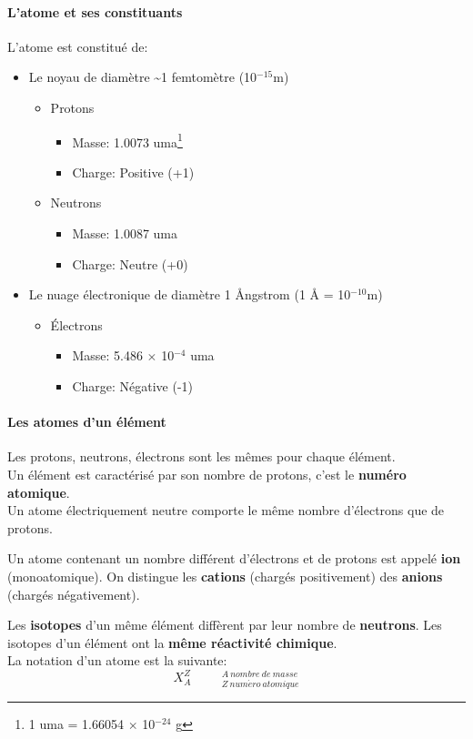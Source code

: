 \documentclass[10pt,a4paper]{book}
\begin{document}
\paragraph{L'atome et ses constituants} L'atome est constitué de:
\begin{itemize}
\item Le noyau de diamètre \textasciitilde 1 femtomètre (10$^{-15}$m)
\begin{itemize}
\item Protons
\begin{itemize}
	\item Masse: 1.0073 uma\footnote{1 uma = 1.66054 $\times$ 10$^{-24}$ g}
	\item Charge: Positive (+1) 
\end{itemize}
\item Neutrons
\begin{itemize}
	\item Masse: 1.0087 uma
	\item Charge: Neutre (+0) 
\end{itemize}
\end{itemize}
\item Le nuage électronique de diamètre 1 {\AA}ngstrom (1 {\AA} = 10$^{-10}$m)
\begin{itemize}
\item Électrons
\begin{itemize}
	\item Masse: 5.486 $\times$ 10$^{-4}$ uma
	\item Charge: Négative (-1) 
\end{itemize}
\end{itemize}
\end{itemize}
\paragraph{Les atomes d'un élément} Les protons, neutrons, électrons sont les mêmes pour chaque élément. \\ 
Un élément est caractérisé par son nombre de protons, c'est le \textbf{numéro atomique}. \\
Un atome électriquement neutre comporte le même nombre d'électrons
que de protons. \par 
Un atome contenant un nombre différent d'électrons et de protons est appelé \textbf{ion} (monoatomique). On distingue les \textbf{cations} (chargés positivement) des \textbf{anions} (chargés négativement). \par
Les \textbf{isotopes} d'un même élément diffèrent par leur nombre de
\textbf{neutrons}. Les isotopes d'un élément ont la \textbf{même réactivité chimique}.\\
La notation d'un atome est la suivante:
\textbf{\[{X_A^Z} \hspace{1cm} { }_{Z \: num\acute{e}ro \: atomique}^{A \: nombre \: de \: masse}\]} %
\end{document}
